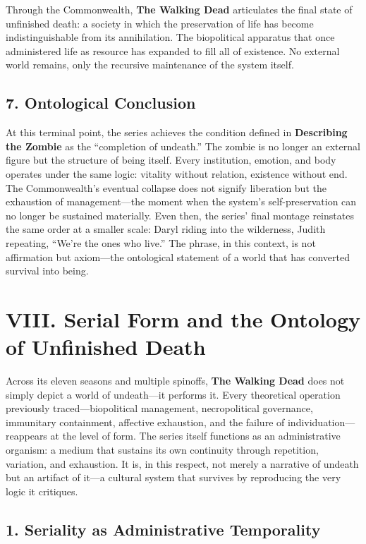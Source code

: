 \documentclass[11pt]{article}
\begin{document}
Through the Commonwealth, \textbf{The Walking Dead} articulates the final state of unfinished death: a society in which the preservation of life has become indistinguishable from its annihilation.  The biopolitical apparatus that once administered life as resource has expanded to fill all of existence.  No external world remains, only the recursive maintenance of the system itself.  
\subsection*{7. Ontological Conclusion}
\label{sec:org8d7a2f6}

At this terminal point, the series achieves the condition defined in \textbf{Describing the Zombie} as the “completion of undeath.”  The zombie is no longer an external figure but the structure of being itself.  Every institution, emotion, and body operates under the same logic: vitality without relation, existence without end.  The Commonwealth’s eventual collapse does not signify liberation but the exhaustion of management—the moment when the system’s self-preservation can no longer be sustained materially.  Even then, the series’ final montage reinstates the same order at a smaller scale: Daryl riding into the wilderness, Judith repeating, “We’re the ones who live.”  The phrase, in this context, is not affirmation but axiom—the ontological statement of a world that has converted survival into being.  
\section*{VIII. Serial Form and the Ontology of Unfinished Death}
\label{sec:org264b3cf}

Across its eleven seasons and multiple spinoffs, \textbf{The Walking Dead} does not simply depict a world of undeath—it performs it.  Every theoretical operation previously traced—biopolitical management, necropolitical governance, immunitary containment, affective exhaustion, and the failure of individuation—reappears at the level of form.  The series itself functions as an administrative organism: a medium that sustains its own continuity through repetition, variation, and exhaustion.  It is, in this respect, not merely a narrative of undeath but an artifact of it—a cultural system that survives by reproducing the very logic it critiques.
\subsection*{1. Seriality as Administrative Temporality}
\label{sec:org8459cd8}
\end{document}
